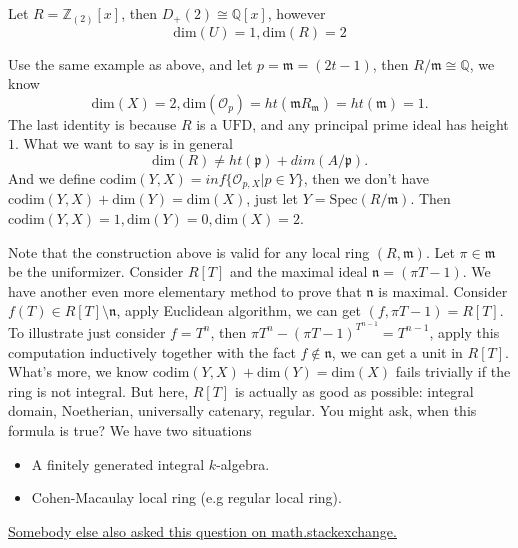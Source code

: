 \documentclass[../main.tex]{subfiles}
\begin{document}
\begin{example}
Let $R=\mathbb{Z}_{(2)}[x]$, then $D_{+}(2)\cong \mathbb{Q}[x]$, however
$$\mathrm{dim}(U)=1, \mathrm{dim}(R)=2$$
\end{example}
\begin{example}
Use the same example as above, and let $p=\mathfrak{m}=(2t-1)$, then $R/\mathfrak{m}\cong \mathbb{Q}$, we know $$\mathrm{dim}(X)=2, \mathrm{dim}(\mathcal{O}_{p})=ht(\mathfrak{m}R_{\mathfrak{m}})=ht(\mathfrak{m})=1.$$The last identity is because $R$ is a $\mathrm{UFD}$, and any principal prime ideal has height $1$. 
What we want to say is in general 
$$\mathrm{dim}(R)\neq ht(\mathfrak{p})+dim(A/\mathfrak{p}).$$
And we define $\mathrm{codim}(Y,X)=inf\{\mathcal{O}_{p,X}|p\in Y\}$, then we don't have $\mathrm{codim}(Y,X)+\mathrm{dim}(Y)=\mathrm{dim}(X)$, just let $Y=\mathrm{Spec}(R/\mathfrak{m})$. Then $\mathrm{codim}(Y,X)=1, \mathrm{dim}(Y)=0, \mathrm{dim}(X)=2.$
\end{example}
\begin{remark}
Note that the construction above is valid for any local ring $(R,\mathfrak{m})$. Let $\pi\in \mathfrak{m}$ be the uniformizer. Consider $R[T]$ and the maximal ideal $\mathfrak{n}=(\pi T-1)$. We have another even more elementary method to prove that $\mathfrak{n}$ is maximal. Consider $f(T)\in R[T]\setminus \mathfrak{n}$, apply Euclidean algorithm, we can get $(f, \pi T-1)=R[T]$. To illustrate just consider $f=T^{n}$, then $\pi T^{n}-(\pi T-1)^{T^{n-1}}=T^{n-1}$, apply this computation inductively together with the fact $f\notin \mathfrak{n}$, we can get a unit in $R[T]$.  What's more, we know $\mathrm{codim}(Y,X)+\mathrm{dim}(Y)= \mathrm{dim}(X)$ fails trivially if the ring is not integral. But here, $R[T]$ is actually as good as possible: integral domain, Noetherian, universally catenary, regular. You might ask, when this formula is true? We have two situations 
\begin{itemize}
    \item A finitely generated integral $k$-algebra.
    \item Cohen-Macaulay local ring (e.g regular local ring).
\end{itemize}
\href{https://math.stackexchange.com/questions/49136/operatornameheight-mathfrakp-dim-a-mathfrakp-dim-a}{Somebody else also asked this question on math.stackexchange.}
\end{remark}
\end{document}
